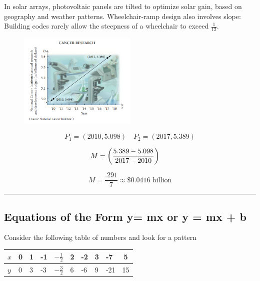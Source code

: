 \documentclass{report}
\begin{document}
\noindent In solar arrays, photovoltaic panels are tilted to optimize solar gain, based on geography and weather patterns. Wheelchair-ramp design also involves slope: Building codes rarely allow the steepness of a wheelchair to exceed $\frac{1}{12}$.
\pagebreak
{}
\begin{figure}[ht]
\centering
\includegraphics[width=0.5\textwidth]{ slope.png }
\end{figure}
\bigbreak \noindent
{}

$$ P_1 = (2010, 5.098) \hspace{1em} P_2 = (2017, 5.389)$$

$$\hspace{-1.5em} M = \left(\frac{5.389 - 5.098}{2017 - 2010}\right)$$

$$ M = \frac{.291}{7} \approx \$0.0416 \text{ billion}$$
\bigbreak \noindent
\hrule
\bigbreak \noindent
{}
\bigbreak \noindent \bigbreak \noindent
  \subsection{Equations of the Form y= mx or y = mx + b}
  \bigbreak \noindent
Consider the following table of numbers and look for a pattern
\bigbreak \bigbreak
\begin{large}
\hspace{9em}\begin{tabular}{|l|l|l|l|l|l|l|l|l|c|}
\hline$x$ & 0 & 1 & -1 & $-\frac{1}{2}$ & 2 & -2 & 3 & -7 & 5 \\
\hline$y$ & 0 & 3 & -3 & $-\frac{3}{2}$ & 6 & -6 & 9 & -21 & 15 \\
\hline
\end{tabular}
\end{large}
\end{document}
